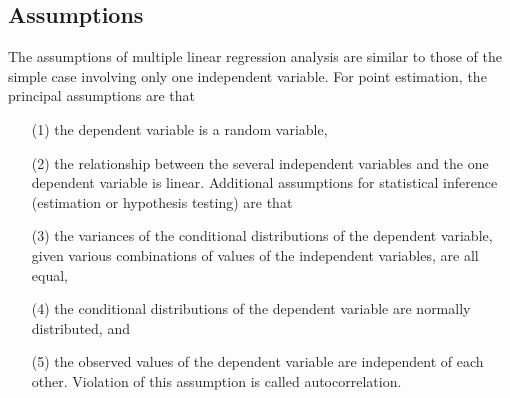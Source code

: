 \newpage






\newpage

\subsection*{Assumptions}
The assumptions of multiple linear regression analysis are similar to those of the simple case involving only one independent variable. For point estimation, the principal assumptions are that
\begin{itemize}
	\item[(1)] the dependent variable is a random variable,
	\item[(2)] the relationship between the several independent variables and the one dependent variable is linear.
	Additional assumptions for statistical inference (estimation or hypothesis testing) are that
	\item[(3)] the variances of the conditional distributions of the dependent variable, given various combinations of values of the independent variables, are all equal,
	\item[(4)] the conditional distributions of the dependent variable
	are normally distributed, and
	\item[(5)] the observed values of the dependent variable are independent of each other. Violation of this assumption is called autocorrelation.
\end{itemize}